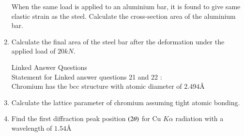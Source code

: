 \documentclass[journal]{IEEEtran}
\begin{document}
\begin{enumerate}[start=10]
When the same load is applied to an aluminium bar, it is found to give same elastic strain as the steel. Calculate the cross-section area of the aluminium bar.
\begin{enumerate}
\end{enumerate}
\item %
Calculate the final area of the steel bar after the deformation under the applied load of $20kN$.
\begin{enumerate}
\end{enumerate}
Linked Answer Questions \\
Statement for  Linked answer questions 21 and 22 :\\
Chromium has the bcc structure with atomic diameter of $2.494 \text{\AA}$
\item %
Calculate the lattice parameter of chromium assuming tight atomic bonding. 
\begin{enumerate}
\end{enumerate}
\item %
Find the first diffraction peak position $\left(2 \theta\right)$ for Cu $K\alpha$ radiation with a wavelength of $1.54 \text{\AA}$
\begin{enumerate}
\end{enumerate}
\end{enumerate}
\end{document}
